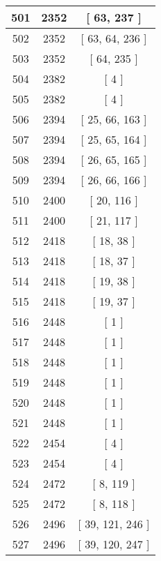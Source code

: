 \begin{center}
\begin{longtable}[H]{|| c c c ||}
\hline
501 & 2352 & [ 63, 237 ] \\ 
\hline
502 & 2352 & [ 63, 64, 236 ] \\ 
\hline
503 & 2352 & [ 64, 235 ] \\ 
\hline
504 & 2382 & [ 4 ] \\ 
\hline
505 & 2382 & [ 4 ] \\ 
\hline
506 & 2394 & [ 25, 66, 163 ] \\ 
\hline
507 & 2394 & [ 25, 65, 164 ] \\ 
\hline
508 & 2394 & [ 26, 65, 165 ] \\ 
\hline
509 & 2394 & [ 26, 66, 166 ] \\ 
\hline
510 & 2400 & [ 20, 116 ] \\ 
\hline
511 & 2400 & [ 21, 117 ] \\ 
\hline
512 & 2418 & [ 18, 38 ] \\ 
\hline
513 & 2418 & [ 18, 37 ] \\ 
\hline
514 & 2418 & [ 19, 38 ] \\ 
\hline
515 & 2418 & [ 19, 37 ] \\ 
\hline
516 & 2448 & [ 1 ] \\ 
\hline
517 & 2448 & [ 1 ] \\ 
\hline
518 & 2448 & [ 1 ] \\ 
\hline
519 & 2448 & [ 1 ] \\ 
\hline
520 & 2448 & [ 1 ] \\ 
\hline
521 & 2448 & [ 1 ] \\ 
\hline
522 & 2454 & [ 4 ] \\ 
\hline
523 & 2454 & [ 4 ] \\ 
\hline
524 & 2472 & [ 8, 119 ] \\ 
\hline
525 & 2472 & [ 8, 118 ] \\ 
\hline
526 & 2496 & [ 39, 121, 246 ] \\ 
\hline
527 & 2496 & [ 39, 120, 247 ] \\ 
\hline
\end{longtable}
\end{center}
